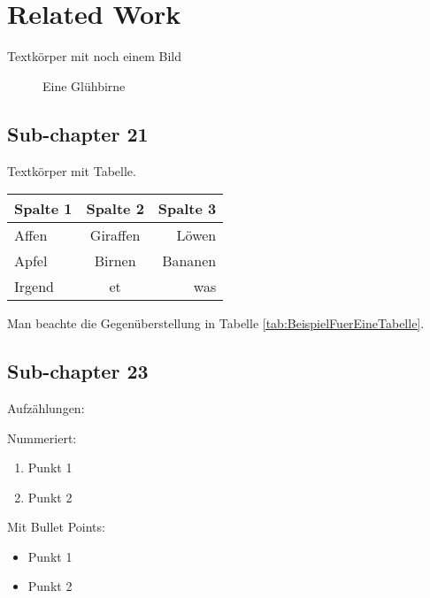 \chapter{Related Work}

Textkörper mit noch einem Bild

\begin{figure}[htbp]
    \centering
    \caption{Eine Glühbirne}
    \label{fig:birne}
\end{figure}



\section{Sub-chapter 21}
\label{sec:Unterkapitel21}

Textkörper mit Tabelle.

\begin{table*}[htbp]
    \centering
    \begin{tabular}{|l|c|r|}
        \hline
        \rowcolor[gray]{0.9}
        Spalte 1 & Spalte 2 & Spalte 3 \\
        \hline
        Affen & Giraffen & Löwen \\
        Apfel & Birnen & Bananen \\
        Irgend & et & was \\
        \hline
    \end{tabular}
    \caption{Beispiel für eine Tabelle}
    \label{tab:BeispielFuerEineTabelle}
\end{table*}

Man beachte die Gegenüberstellung in Tabelle \ref{tab:BeispielFuerEineTabelle}.


\section{Sub-chapter 23}
\label{sec:Unterkapitel23}

Aufzählungen:

Nummeriert:

\begin{enumerate}
    \item Punkt 1
    \item Punkt 2
\end{enumerate}

Mit Bullet Points:

\begin{itemize}
    \item Punkt 1
    \item Punkt 2
\end{itemize}

